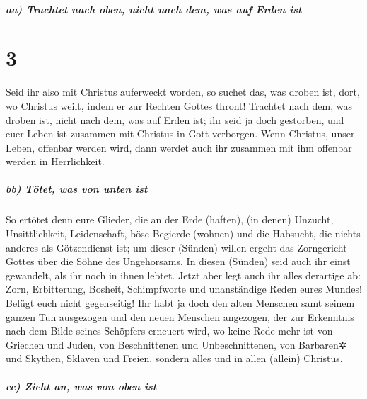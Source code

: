 \hypertarget{aa-trachtet-nach-oben-nicht-nach-dem-was-auf-erden-ist}{%
\subparagraph{aa) Trachtet nach oben, nicht nach dem, was auf Erden
ist}\label{aa-trachtet-nach-oben-nicht-nach-dem-was-auf-erden-ist}}

\hypertarget{section-2}{%
\section{3}\label{section-2}}

 Seid ihr also mit Christus auferweckt worden, so suchet
das, was droben ist, dort, wo Christus weilt, indem er zur Rechten
Gottes thront!  Trachtet nach dem, was droben ist, nicht
nach dem, was auf Erden ist;  ihr seid ja doch gestorben,
und euer Leben ist zusammen mit Christus in Gott verborgen.
 Wenn Christus, unser Leben, offenbar werden wird, dann
werdet auch ihr zusammen mit ihm offenbar werden in Herrlichkeit.

\hypertarget{bb-tuxf6tet-was-von-unten-ist}{%
\subparagraph{bb) Tötet, was von unten
ist}\label{bb-tuxf6tet-was-von-unten-ist}}

 So ertötet denn eure Glieder, die an der Erde (haften),
(in denen) Unzucht, Unsittlichkeit, Leidenschaft, böse Begierde (wohnen)
und die Habsucht, die nichts anderes als Götzendienst ist;
 um dieser (Sünden) willen ergeht das Zorngericht Gottes
über die Söhne des Ungehorsams.  In diesen (Sünden) seid
auch ihr einst gewandelt, als ihr noch in ihnen lebtet. 
Jetzt aber legt auch ihr alles derartige ab: Zorn, Erbitterung, Bosheit,
Schimpfworte und unanständige Reden eures Mundes!  Belügt
euch nicht gegenseitig! Ihr habt ja doch den alten Menschen samt seinem
ganzen Tun ausgezogen  und den neuen Menschen angezogen,
der zur Erkenntnis nach dem Bilde seines Schöpfers erneuert wird,
 wo keine Rede mehr ist von Griechen und Juden, von
Beschnittenen und Unbeschnittenen, von Barbaren✲ und Skythen, Sklaven
und Freien, sondern alles und in allen (allein) Christus.

\hypertarget{cc-zieht-an-was-von-oben-ist}{%
\subparagraph{cc) Zieht an, was von oben
ist}\label{cc-zieht-an-was-von-oben-ist}}

